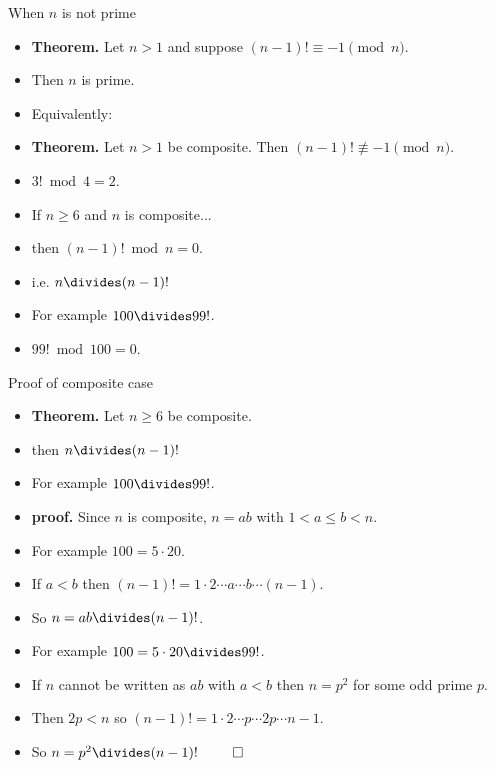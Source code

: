 \documentclass[handout]{beamer}
\begin{document}
\begin{frame}{When $n$ is not prime}

\begin{itemize}
  \item \textbf{Theorem.} Let $n>1$ and suppose $(n-1)! \equiv -1 \pmod n$.
  \item Then $n$ is prime.
  \item Equivalently:
  \item \textbf{Theorem.} Let $n>1$ be composite. Then $(n-1)! \not\equiv -1 \pmod n$.
  \item $3! \bmod 4 = 2$.
  \item If $n \geq 6$ and $n$ is composite...
  \item then $(n-1)! \bmod n = 0$.
  \item i.e. $n \divides (n-1)!$
  \item For example $100\divides 99!$.
  \item $99! \bmod 100 = 0$.
\end{itemize}

\end{frame}

\begin{frame}{Proof of composite case}

\begin{itemize}
  \item \textbf{Theorem.} Let $n \geq 6$ be composite.
  \item then $n \divides (n-1)!$
  \item For example $100\divides 99!$.
  \item \textbf{proof.} Since $n$ is composite, $n=ab$ with $1< a \leq b < n$.
  \item For example $100 = 5\cdot 20$.
  \item If $a<b$ then $(n-1)! = 1\cdot 2 \cdots a \cdots b \cdots (n-1)$.
  \item So $n=ab \divides (n-1)!$.
  \item For example $100 = 5\cdot 20 \divides 99!$.
  \item If $n$ cannot be written as $ab$ with $a<b$ then $n=p^2$ for some odd prime $p$.
  \item Then $2p < n$ so $(n-1)! = 1\cdot 2 \cdots p \cdots 2p \cdots n-1$.
  \item So $n=p^2 \divides (n-1)!$ $\qed$
\end{itemize}

\end{frame}
\end{document}
